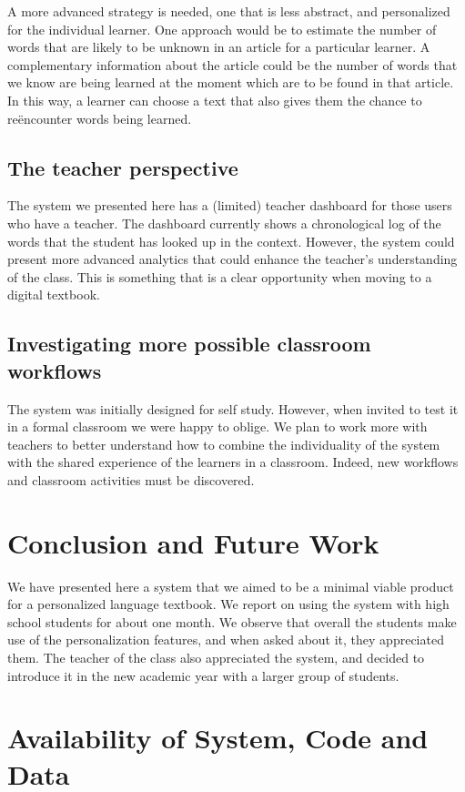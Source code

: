 A more advanced strategy is needed, one that is less abstract, and personalized for the individual learner. One approach would be to estimate the number of words that are likely to be unknown in an article for a particular learner. A complementary information about the article could be the number of words that we know are being learned at the moment which are to be found in that article. In this way, a learner can choose a text that also gives them the chance to re{\"e}ncounter words being learned. 

\subsection{The teacher perspective}
The system we presented here has a (limited) teacher dashboard for those users who have a teacher. The dashboard currently shows a chronological log of the words that the student has looked up in the context. However, the system could present more advanced analytics that could enhance the teacher's understanding of the class. This is something that is a clear opportunity when moving to a digital textbook. 

\subsection{Investigating more possible classroom workflows}
The system was initially designed for self study. However, when invited to test it in a formal classroom we were happy to oblige. We plan to work more with teachers to better understand how to combine the individuality of the system with the shared experience of the learners in a classroom. Indeed, new workflows and classroom activities must be discovered.


\section{Conclusion and Future Work}
We have presented here a system that we aimed to be a minimal viable product for a personalized language textbook. We report on using the system with high school students for about one month. We observe that overall the students make use of the personalization features, and when asked about it, they appreciated them. The teacher of the class also appreciated the system, and decided to introduce it in the new academic year with a larger group of students. 


\section{Availability of System, Code and Data}

